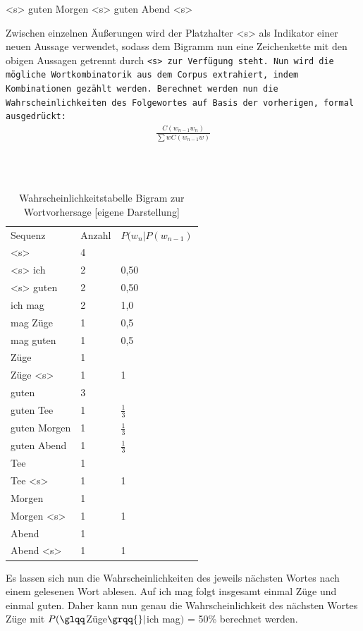 \documentclass[12pt]{report}
\begin{document}
<s> guten Morgen <s> guten Abend <s>
\\ \rm

Zwischen einzelnen Äußerungen wird der Platzhalter <s> als Indikator einer neuen Aussage verwendet, sodass dem Bigramm nun eine Zeichenkette mit den obigen Aussagen getrennt durch \tt <s> \rm zur Verfügung steht. Nun wird die mögliche Wortkombinatorik aus dem Corpus extrahiert, indem Kombinationen gezählt werden. Berechnet werden nun die Wahrscheinlichkeiten des Folgewortes auf Basis der vorherigen, formal ausgedrückt: \begin{align}
\frac{C(w_{n-1} w_{n})}{\sum{w}{}C(w_{n-1}w)}
\end{align}
\begin{table}[h!]
\tt
\begin{tabular}{lll}
Sequenz & Anzahl & $P(w_{n}|P(w_{n-1})$ \\
<s> & 4 & \\
<s> ich & 2 & 0,50 \\
<s> guten & 2 & 0,50 \\ 
ich mag & 2 & 1,0 \\ 
mag Züge & 1 & 0,5 \\
mag guten & 1 & 0,5 \\
Züge & 1 & \\
Züge <s> & 1 & 1 \\
guten & 3 & \\
guten Tee & 1 & $\frac{1}{3}$ \\
guten Morgen & 1 & $\frac{1}{3}$ \\
guten Abend & 1 & $\frac{1}{3}$ \\
Tee & 1 & \\
Tee <s> & 1 & 1 \\
Morgen & 1 & \\
Morgen <s> & 1 & 1 \\
Abend & 1 & \\
Abend <s> & 1 & 1\\
\end{tabular}
\rm
\caption{Wahrscheinlichkeitstabelle Bigram zur Wortvorhersage [eigene Darstellung]}
\end{table}

Es lassen sich nun die Wahrscheinlichkeiten des jeweils nächsten Wortes nach einem gelesenen Wort ablesen. Auf \glqq  ich mag\grqq{} folgt insgesamt einmal \glqq  Züge\grqq{} und einmal \glqq  guten\grqq{}. Daher kann nun genau die Wahrscheinlichkeit des nächsten Wortes \glqq  Züge\grqq{} mit $P(\glqq  $Züge$\grqq{}|$\glqq  ich mag\grqq{}$)$ = 50\% berechnet werden.
\end{document}

